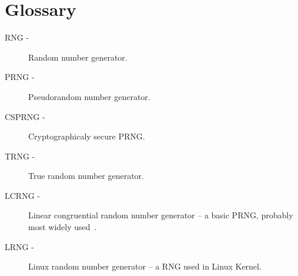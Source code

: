 \chapter{Glossary}\label{chap:glossary}

\begin{description}
 \item [RNG -] Random number generator.
 \item [PRNG -] Pseudorandom number generator.
 \item [CSPRNG -] Cryptographicaly secure PRNG.
 \item [TRNG -] True random number generator.
 \item [LCRNG -] Linear congruential random number generator -- a basic PRNG, probably most widely used~\cite[p.~151]{CryptographyAndNetworkSecurity}.
 \item [LRNG -] Linux random number generator -- a RNG used in Linux Kernel.
\end{description}
